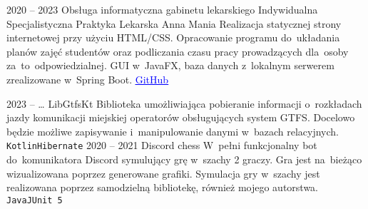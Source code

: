 \documentclass[8pt]{developercv} %
\begin{document}


\begin{entrylist}
  \entry
    {2020 -- 2023}
    {Obsługa informatyczna gabinetu lekarskiego}
    {Indywidualna Specjalistyczna Praktyka Lekarska Anna Mania}
    {
      Realizacja statycznej strony internetowej przy użyciu HTML/CSS.
      Opracowanie programu do~układania planów zajęć studentów oraz podliczania czasu pracy prowadzących dla~osoby za~to~odpowiedzialnej.
      GUI w~JavaFX, baza danych z~lokalnym serwerem zrealizowane w~Spring Boot.
      \href{https://github.com/pulkowski-jan/timetablescheduler}{
        \textcolor{blue}{\underline{GitHub}}
      }
    }
\end{entrylist}


\begin{entrylist}
  \entry
    {2023 -- \ldots}
    {LibGtfsKt}
    {}
    {
      Biblioteka umożliwiająca pobieranie informacji o~rozkładach jazdy komunikacji miejskiej operatorów obsługujących system GTFS.
      Docelowo będzie możliwe zapisywanie i~manipulowanie danymi w~bazach relacyjnych.
      \texttt{Kotlin}\slashsep\texttt{Hibernate}
    }
  \entry
    {2020 -- 2021}
    {Discord chess}
    {}
    {
      W~pełni funkcjonalny bot do~komunikatora Discord symulujący grę w~szachy 2 graczy.
      Gra jest na~bieżąco wizualizowana poprzez generowane grafiki.
      Symulacja gry w~szachy jest realizowana poprzez samodzielną bibliotekę, również mojego autorstwa.
      \\\texttt{Java}\slashsep\texttt{JUnit 5}
    }
\end{entrylist}


\end{document}
